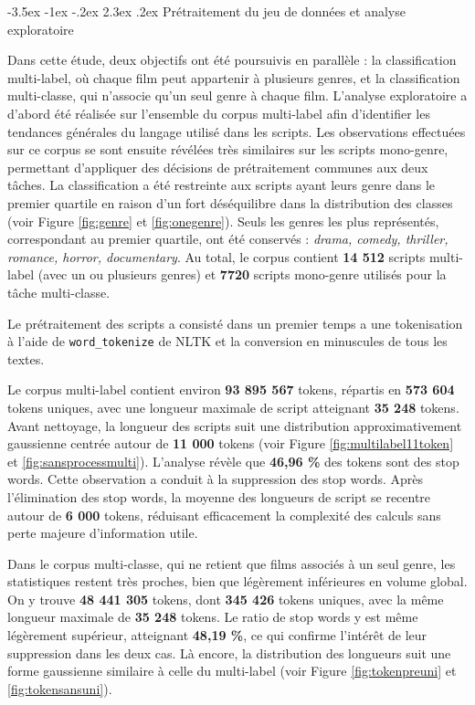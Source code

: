 \documentclass[12pt]{report}
\makeatletter
\renewcommand{\chapter}{\@startsection{chapter}{0}{\z@}
  {-3.5ex \@plus -1ex \@minus -.2ex}
  {2.3ex \@plus.2ex}
  {\normalfont\LARGE\bfseries}}
\makeatother
\begin{document}
\chapter{Prétraitement du jeu de données et analyse exploratoire}

Dans cette étude, deux objectifs ont été poursuivis en parallèle : la classification multi-label, où chaque film peut appartenir à plusieurs genres, et la classification multi-classe, qui n'associe qu’un seul genre à chaque film. L’analyse exploratoire a d’abord été réalisée sur l’ensemble du corpus multi-label afin d’identifier les tendances générales du langage utilisé dans les scripts. Les observations effectuées sur ce corpus se sont ensuite révélées très similaires sur les scripts mono-genre, permettant d’appliquer des décisions de prétraitement communes aux deux tâches. La classification a été restreinte aux scripts ayant leurs genre dans le premier quartile en raison d’un fort déséquilibre dans la distribution des classes (voir Figure \ref{fig:genre} et \ref{fig:onegenre}). Seuls les genres les plus représentés, correspondant au premier quartile, ont été conservés : \textit{drama, comedy, thriller, romance, horror, documentary}. Au total, le corpus contient \textbf{14 512} scripts multi-label (avec un ou plusieurs genres) et \textbf{7720} scripts mono-genre utilisés pour la tâche multi-classe. 

Le prétraitement des scripts a consisté dans un premier temps a une tokenisation à l’aide de \texttt{word\_tokenize} de NLTK et la conversion en minuscules de tous les textes. 

Le corpus multi-label contient environ \textbf{93 895 567} tokens, répartis en \textbf{573 604} tokens uniques, avec une longueur maximale de script atteignant \textbf{35 248} tokens. Avant nettoyage, la longueur des scripts suit une distribution approximativement gaussienne centrée autour de \textbf{11 000} tokens (voir Figure \ref{fig:multilabel11token} et \ref{fig:sansprocessmulti}). L’analyse révèle que \textbf{46,96 \%} des tokens sont des stop words. Cette observation a conduit à la suppression des stop words. Après l'élimination des stop words, la moyenne des longueurs de script se recentre autour de \textbf{6 000} tokens, réduisant efficacement la complexité des calculs sans perte majeure d’information utile.\newline


Dans le corpus multi-classe, qui ne retient que  films associés à un seul genre, les statistiques restent très proches, bien que légèrement inférieures en volume global. On y trouve \textbf{48 441 305} tokens, dont \textbf{345 426} tokens uniques, avec la même longueur maximale de \textbf{35 248} tokens. Le ratio de stop words y est même légèrement supérieur, atteignant \textbf{48,19 \%}, ce qui confirme l’intérêt de leur suppression dans les deux cas. Là encore, la distribution des longueurs suit une forme gaussienne similaire à celle du multi-label (voir Figure \ref{fig:tokenpreuni} et \ref{fig:tokensansuni}). 
\end{document}
